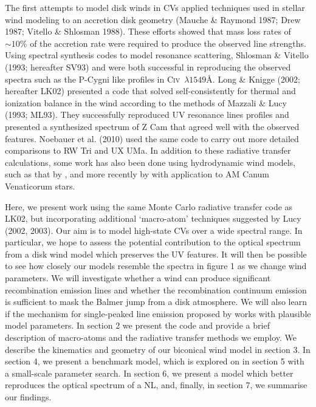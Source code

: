 \documentclass[preprint, a4paper, 11pt]{aastex}
\begin{document}
The first attempts to model disk winds in CVs applied techniques used in stellar
wind modeling to an accretion disk geometry (Mauche \& Raymond
1987; Drew 1987; Vitello \& Shlosman 1988). These efforts showed that mass loss rates of
$\sim10\%$ of the accretion rate
were required to produce the observed line strengths.
Using spectral synthesis codes to model resonance scattering,
Shlosman \& Vitello (1993; hereafter SV93)\nocite{SV93} and \cite{KWD95}
were both successful in reproducing the observed spectra such as the P-Cygni like
profiles in C\textsc{iv}~$\lambda1549$\AA.
Long \& Knigge (2002; hereafter LK02)\nocite{LK02} presented a code that
solved self-consistently for thermal and ionization balance in the wind
according to the methods of Mazzali \& Lucy (1993; ML93)\nocite{ML93}. They successfully reproduced
UV resonance lines profiles and presented a synthesized spectrum of Z Cam
that agreed well with the observed features. Noebauer et al. (2010) used the same code 
to carry out more detailed comparisons to RW Tri and UX UMa. In addition to these 
radiative transfer calculations, some work has also been done using hydrodynamic wind models, 
such as that by \cite{pkdh2002}, and more recently by \cite{kusterer2014} with application to
AM Canum Venaticorum stars.

Here, we present work using the same Monte Carlo radiative transfer code as LK02, 
but incorporating additional `macro-atom' techniques suggested by Lucy (2002, 2003). 
Our aim is to model high-state CVs over a wide spectral range.
In particular, we hope to assess the potential contribution
to the optical spectrum from a disk wind model which preserves the UV features.
It will then be possible to see how closely
our models resemble the spectra in figure 1 as we change wind parameters.
We will investigate whether a wind can produce significant
recombination emission lines and whether the recombination
continuum emission is sufficient to mask the Balmer jump from a disk atmosphere.
We will also learn if the mechanism for single-peaked line emission
proposed by \cite{MC96} works with plausible model parameters.
In section 2 we present the code and provide a brief description of macro-atoms 
and the radiative transfer methods we employ. 
We describe the kinematics and geometry of our biconical wind model in section 3.
In section 4, we present a benchmark model, which is explored on in section 5 
with a small-scale parameter search. In section 6, we present a
model which better reproduces the optical spectrum of a NL, and, 
finally, in section 7, we summarise our findings.
\end{document}
